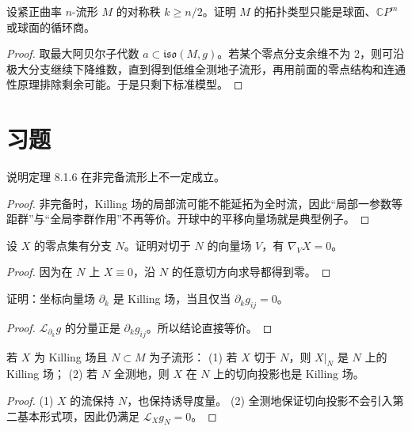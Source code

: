 \documentclass[11pt,a4paper,openany]{ctexbook}
\numberwithin{equation}{chapter}
\begin{document}
\begin{problem}
设紧正曲率 \(n\)-流形 \(M\) 的对称秩 \(k\ge n/2\)。证明 \(M\) 的拓扑类型只能是球面、\(\mathbb CP^m\) 或球面的循环商。
\end{problem}
\begin{proof}
取最大阿贝尔子代数 \(a\subset\mathfrak{iso}(M,g)\)。若某个零点分支余维不为 2，则可沿极大分支继续下降维数，直到得到低维全测地子流形，再用前面的零点结构和连通性原理排除剩余可能。于是只剩下标准模型。
\end{proof}

\section{习题}

\begin{exercise}
说明定理 8.1.6 在非完备流形上不一定成立。
\end{exercise}
\begin{proof}
非完备时，Killing 场的局部流可能不能延拓为全时流，因此“局部一参数等距群”与“全局李群作用”不再等价。开球中的平移向量场就是典型例子。
\end{proof}

\begin{exercise}
设 \(X\) 的零点集有分支 \(N\)。证明对切于 \(N\) 的向量场 \(V\)，有 \(\nabla_VX=0\)。
\end{exercise}
\begin{proof}
因为在 \(N\) 上 \(X\equiv 0\)，沿 \(N\) 的任意切方向求导都得到零。
\end{proof}

\begin{exercise}
证明：坐标向量场 \(\partial_k\) 是 Killing 场，当且仅当 \(\partial_k g_{ij}=0\)。
\end{exercise}
\begin{proof}
\(\mathcal L_{\partial_k}g\) 的分量正是 \(\partial_k g_{ij}\)。所以结论直接等价。
\end{proof}

\begin{exercise}
若 \(X\) 为 Killing 场且 \(N\subset M\) 为子流形：
(1) 若 \(X\) 切于 \(N\)，则 \(X|_N\) 是 \(N\) 上的 Killing 场；
(2) 若 \(N\) 全测地，则 \(X\) 在 \(N\) 上的切向投影也是 Killing 场。
\end{exercise}
\begin{proof}
(1) \(X\) 的流保持 \(N\)，也保持诱导度量。  
(2) 全测地保证切向投影不会引入第二基本形式项，因此仍满足 \(\mathcal L_Xg_N=0\)。
\end{proof}
\end{document}
